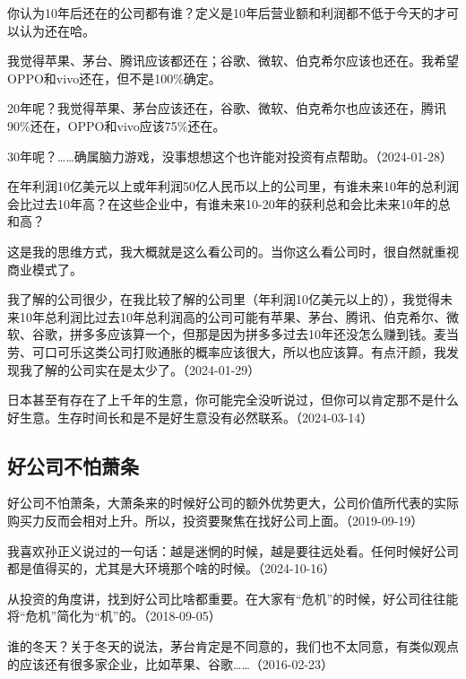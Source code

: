 你认为10年后还在的公司都有谁？定义是10年后营业额和利润都不低于今天的才可以认为还在哈。

我觉得苹果、茅台、腾讯应该都还在；谷歌、微软、伯克希尔应该也还在。我希望OPPO和vivo还在，但不是100\%确定。

20年呢？我觉得苹果、茅台应该还在，谷歌、微软、伯克希尔也应该还在，腾讯90\%还在，OPPO和vivo应该75\%还在。

30年呢？……确属脑力游戏，没事想想这个也许能对投资有点帮助。（2024-01-28）

在年利润10亿美元以上或年利润50亿人民币以上的公司里，有谁未来10年的总利润会比过去10年高？在这些企业中，有谁未来10-20年的获利总和会比未来10年的总和高？


这是我的思维方式，我大概就是这么看公司的。当你这么看公司时，很自然就重视商业模式了。

我了解的公司很少，在我比较了解的公司里（年利润10亿美元以上的），我觉得未来10年总利润比过去10年总利润高的公司可能有苹果、茅台、腾讯、伯克希尔、微软、谷歌，拼多多应该算一个，但那是因为拼多多过去10年还没怎么赚到钱。麦当劳、可口可乐这类公司打败通胀的概率应该很大，所以也应该算。有点汗颜，我发现我了解的公司实在是太少了。（2024-01-29）


日本甚至有存在了上千年的生意，你可能完全没听说过，但你可以肯定那不是什么好生意。生存时间长和是不是好生意没有必然联系。（2024-03-14）

\subsection{好公司不怕萧条}

好公司不怕萧条，大萧条来的时候好公司的额外优势更大，公司价值所代表的实际购买力反而会相对上升。所以，投资要聚焦在找好公司上面。（2019-09-19）

我喜欢孙正义说过的一句话：越是迷惘的时候，越是要往远处看。任何时候好公司都是值得买的，尤其是大环境那个啥的时候。（2024-10-16）

从投资的角度讲，找到好公司比啥都重要。在大家有“危机”的时候，好公司往往能将“危机”简化为“机”的。（2018-09-05）


谁的冬天？关于冬天的说法，茅台肯定是不同意的，我们也不太同意，有类似观点的应该还有很多家企业，比如苹果、谷歌……（2016-02-23）

